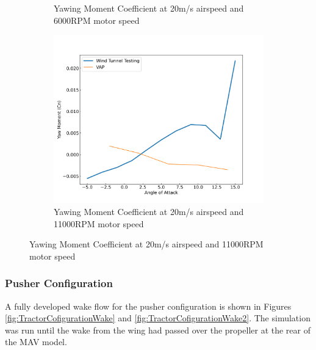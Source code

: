 \begin{figure}[H]
\begin{subfigure}[b]{0.467\textwidth}
        \caption{Yawing Moment Coefficient at 20m/s airspeed and 6000RPM motor speed}
        \label{fig:VAP_Cn_20ms_6000}
    \end{subfigure}
    \begin{subfigure}[b]{0.467\textwidth}
        \centering
        \includegraphics[width=\textwidth]{05_Results/VAP/tractor/Cn/20ms_11000RPM_Cn.png}
        \caption{Yawing Moment Coefficient at 20m/s airspeed and 11000RPM motor speed}
        \label{fig:VAP_Cn_20ms_11000}
    \end{subfigure}
\end{figure}


\subsubsection{Pusher Configuration}

A fully developed wake flow for the pusher configuration is shown in Figures \ref{fig:TractorCofigurationWake} and \ref{fig:TractorCofigurationWake2}. The simulation was run until the wake from the wing had passed over the propeller at the rear of the \acrshort{MAV} model.

